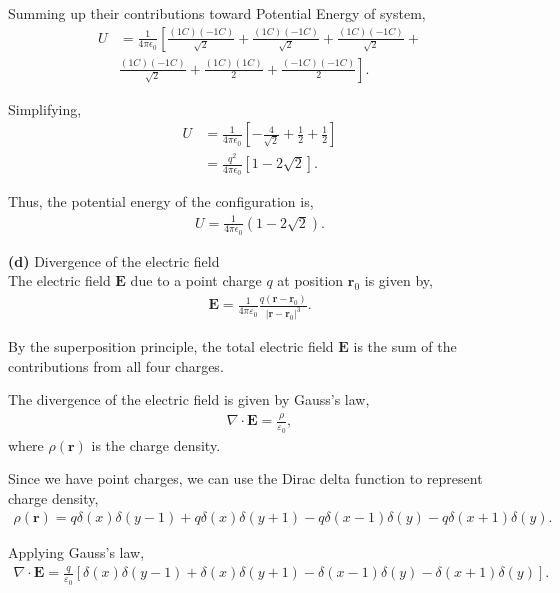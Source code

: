 \documentclass{article}
\begin{document}
Summing up their contributions toward Potential Energy of system,
\begin{align*}
    U &= \frac{1}{4\pi\epsilon_0} \left[ \frac{(1C)(-1C)}{\sqrt{2}} + \frac{(1C)(-1C)}{\sqrt{2}} + \frac{(1C)(-1C)}{\sqrt{2}} + \right. \\ 
    &\left. \frac{(1C)(-1C)}{\sqrt{2}} + \frac{(1C)(1C)}{2} + \frac{(-1C)(-1C)}{2} \right].
\end{align*}

Simplifying,
\begin{align*}
    U &= \frac{1}{4\pi\epsilon_0} \left[ -\frac{4}{\sqrt{2}} + \frac{1}{2} + \frac{1}{2} \right] \\
    &= \frac{q^2}{4\pi\epsilon_0} \left[ 1 - 2\sqrt{2} \right].
\end{align*}

Thus, the potential energy of the configuration is,
\begin{align*}
U = \frac{1}{4\pi\epsilon_0} (1 - 2\sqrt{2}).
\end{align*}

\textbf{(d)} Divergence of the electric field\\
The electric field $\mathbf{E}$ due to a point charge $q$ at position $\mathbf{r}_0$ is given by,
\begin{align*}
    \mathbf{E} = \frac{1}{4\pi\varepsilon_0} \frac{q (\mathbf{r} - \mathbf{r}_0)}{|\mathbf{r} - \mathbf{r}_0|^3}.
\end{align*}

By the superposition principle, the total electric field $\mathbf{E}$ is the sum of the contributions from all four charges.

The divergence of the electric field is given by Gauss's law,
\begin{align*}
    \nabla \cdot \mathbf{E} = \frac{\rho}{\varepsilon_0},
\end{align*}
where $\rho(\mathbf{r})$ is the charge density.

Since we have point charges, we can use the Dirac delta function to represent charge density,
\begin{align*}
    \rho(\mathbf{r}) = q \delta(x)\delta(y - 1) + q \delta(x)\delta(y + 1) - q \delta(x - 1)\delta(y) - q \delta(x + 1)\delta(y).
\end{align*}

Applying Gauss's law,
\begin{align*}
    \nabla \cdot \mathbf{E} = \frac{q}{\varepsilon_0} \left[ \delta(x)\delta(y - 1) + \delta(x)\delta(y + 1) - \delta(x - 1)\delta(y) - \delta(x + 1)\delta(y) \right].
\end{align*}
\end{document}
